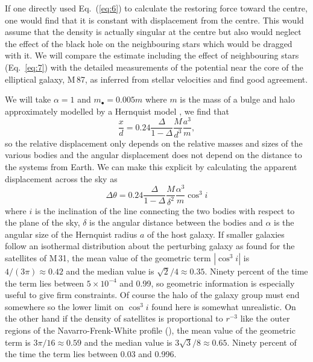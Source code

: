 \documentclass[useAMS,usenatbib]{mn2e}
\begin{document}
If one directly used Eq.~(\ref{eq:6}) to calculate the restoring force
toward the centre, one would find that it is constant with
displacement from the centre.  This would assume that the density is
actually singular at the centre but also would neglect the effect of
the black hole on the neighbouring stars which would be dragged with
it.  We will compare the estimate including the effect of neighbouring
stars (Eq.~\ref{eq:7}) with the detailed measurements of the potential
near the core of the elliptical galaxy, M\,87, as inferred from
stellar velocities and find good agreement.

We will take $\alpha=1$ and $m_\bullet=0.005m$ where 
$m$ is the mass of a bulge and
halo approximately modelled by a Hernquist model \citep[as
  in][]{1997ApJ...487..153V}, we find that
\begin{equation}
  \frac{x}{d} = 0.24 
\frac{\Delta}{1-\Delta} \frac{M}{d^3} \frac{a^3}{m},
  \label{eq:8}
\end{equation}
so the relative displacement only depends on the relative masses and
sizes of the various bodies and the angular displacement does not
depend on the distance to the systems from Earth.  We can make this
explicit by calculating the apparent displacement across the sky as
\begin{equation}
  \Delta \theta = 0.24 \frac{\Delta}{1-\Delta} \frac{M}{\delta^2} \frac{\alpha^3}{m} \cos^3 i
\end{equation}
where $i$ is the inclination of the line connecting the two bodies
with respect to the plane of the sky, $\delta$ is the angular distance
between the bodies and $\alpha$ is the angular size of the Hernquist
radius $a$ of the host galaxy.  If smaller galaxies follow
an isothermal distribution about the perturbing galaxy as
\citet{2006AJ....131.1405K} found for the satellites of M\,31, the
mean value of the geometric term $|\cos^3i|$ is $4/(3\pi) \approx
0.42$ and the median value is $\sqrt{2}/4\approx 0.35$.  Ninety
percent of the time the term lies between $5\times 10^{-4}$ and 0.99,
so geometric information is especially useful to give firm
constraints.  Of course the halo of the galaxy group must end
somewhere so the lower limit on $\cos^3 i$ found here is somewhat
unrealistic.  On the other hand if the density of satellites is
proportional to $r^{-3}$ like the outer regions of the
Navarro-Frenk-White profile (\citeyear{1996ApJ...462..563N}), the mean
value of the geometric term is $3\pi/16 \approx 0.59$ and the median
value is $3\sqrt{3}/8 \approx 0.65$.  Ninety percent of the time the
term lies between 0.03 and 0.996.
\end{document}
